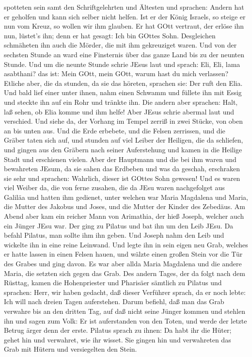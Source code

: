 spotteten sein samt den Schriftgelehrten und Ältesten und sprachen:
 Andern hat er geholfen und kann sich selber nicht helfen.
Ist er der König Israels, so steige er nun vom Kreuz, so wollen wir ihm
glauben.  Er hat GOtt vertraut, der erlöse ihn nun,
lüstet's ihn; denn er hat gesagt: Ich bin GOttes Sohn. 
Desgleichen schmäheten ihn auch die Mörder, die mit ihm gekreuziget
waren.  Und von der sechsten Stunde an ward eine Finsternis
über das ganze Land bis zu der neunten Stunde.  Und um die
neunte Stunde schrie JEsus laut und sprach: Eli, Eli, lama asabthani?
das ist: Mein GOtt, mein GOtt, warum hast du mich verlassen?
 Etliche aber, die da stunden, da sie das höreten, sprachen
sie: Der ruft den Elia.  Und bald lief einer unter ihnen,
nahm einen Schwamm und füllete ihn mit Essig und steckte ihn auf ein
Rohr und tränkte ihn.  Die andern aber sprachen: Halt, laß
sehen, ob Elia komme und ihm helfe!  Aber JEsus schrie
abermal laut und verschied.  Und siehe da, der Vorhang im
Tempel zerriß in zwei Stücke, von oben an bis unten aus. 
Und die Erde erbebete, und die Felsen zerrissen, und die Gräber taten
sich auf, und stunden auf viel Leiber der Heiligen, die da schliefen,
 und gingen aus den Gräbern nach seiner Auferstehung und
kamen in die Heilige Stadt und erschienen vielen.  Aber der
Hauptmann und die bei ihm waren und bewahreten JEsum, da sie sahen das
Erdbeben und was da geschah, erschraken sie sehr und sprachen: Wahrlich,
dieser ist GOttes Sohn gewesen!  Und es waren viel Weiber
da, die von ferne zusahen, die da JEsu waren nachgefolget aus Galiläa
und hatten ihm gedienet,  unter welchen war Maria Magdalena
und Maria, die Mutter des Jakobus und Joses, und die Mutter der Kinder
des Zebedäus.  Am Abend aber kam ein reicher Mann von
Arimathia, der hieß Joseph, welcher auch ein Jünger JEsu war.
 Der ging zu Pilatus und bat ihn um den Leib JEsu. Da
befahl Pilatus, man sollte ihm ihn geben.  Und Joseph nahm
den Leib und wickelte ihn in eine reine Leinwand.  Und
legte ihn in sein eigen neu Grab, welches er hatte lassen in einen
Felsen hauen, und wälzte einen großen Stein vor die Tür des Grabes und
ging davon.  Es war aber allda Maria Magdalena und die
andere Maria, die setzten sich gegen das Grab.  Des andern
Tages, der da folgt nach dem Rüsttag, kamen die Hohenpriester und
Pharisäer sämtlich zu Pilatus  und sprachen: Herr, wir
haben gedacht, daß dieser Verführer sprach, da er noch lebte: Ich will
nach dreien Tagen auferstehen.  Darum befiehl, daß man das
Grab verwahre bis an den dritten Tag, auf daß nicht seine Jünger kommen
und stehlen ihn und sagen zum Volk: Er ist auferstanden von den Toten,
und werde der letzte Betrug ärger denn der erste.  Pilatus
sprach zu ihnen: Da habt ihr die Hüter; gehet hin und verwahret, wie ihr
wisset.  Sie gingen hin und verwahreten das Grab mit Hütern
und versiegelten den Stein.

